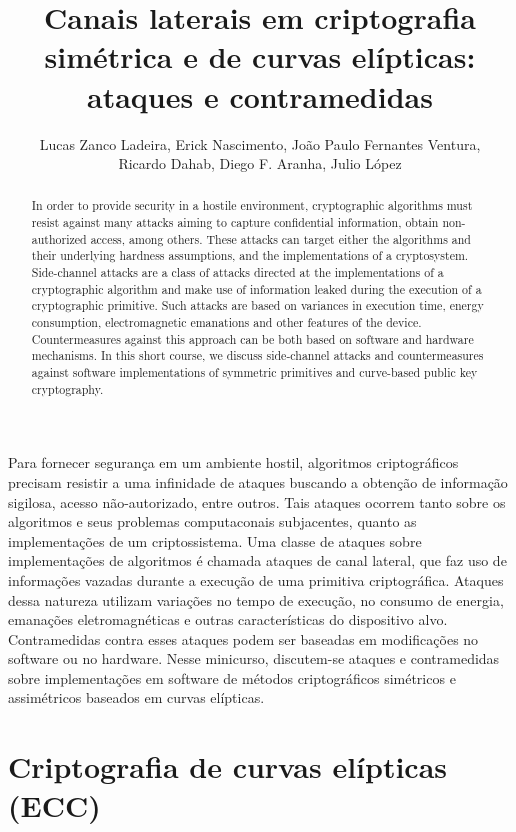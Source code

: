 \documentclass{SBCbookchapter}
\title{Canais laterais em criptografia simétrica e de curvas elípticas: ataques e contramedidas}
\author{Lucas Zanco Ladeira, Erick Nascimento, João Paulo Fernantes Ventura,\\ Ricardo Dahab, Diego F. Aranha, Julio López}
\begin{document}
 

\maketitle
     
\begin{resumo}
Para fornecer segurança em um ambiente hostil, algoritmos criptográficos precisam resistir a uma infinidade de ataques buscando a obtenção de informação sigilosa, acesso não-autorizado, entre outros. Tais ataques ocorrem tanto sobre os algoritmos e seus problemas computaconais subjacentes, quanto as implementações de um criptossistema. Uma classe de ataques sobre implementações de algoritmos é chamada ataques de canal lateral, que faz uso de informações vazadas durante a execução de uma primitiva criptográfica. Ataques dessa natureza utilizam variações no tempo de execução, no consumo de energia, emanações eletromagnéticas e outras características do dispositivo alvo. Contramedidas contra esses ataques podem ser baseadas em modificações no software ou no hardware. Nesse minicurso, discutem-se ataques e contramedidas sobre implementações em software de métodos criptográficos simétricos e assimétricos baseados em curvas elípticas.
\end{resumo}

\begin{abstract}
In order to provide security in a hostile environment, cryptographic algorithms must resist against many attacks aiming to capture confidential information, obtain non-authorized access, among others. These attacks can target either the algorithms and their underlying hardness assumptions, and the implementations of a cryptosystem. Side-channel attacks are a class of attacks directed at the implementations of a cryptographic algorithm and make use of information leaked during the execution of a cryptographic primitive. Such attacks are based on variances in execution time, energy consumption, electromagnetic emanations and other features of the device. Countermeasures against this approach can be both based on software and hardware mechanisms. In this short course, we discuss side-channel attacks and countermeasures against software implementations of symmetric primitives and curve-based public key cryptography.
\end{abstract}






\section{Criptografia de curvas elípticas (ECC)}

\end{document}
